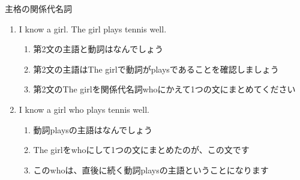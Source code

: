 \documentclass[aspectratio=169,xcolor={dvipsnames,table}]{beamer}
\begin{document}
\begin{frame}[plain]{主格の関係代名詞}

\dbend%

\bigskip

\begin{enumerate}
 \item<1-> I know a girl. The girl plays tennis well.
       \begin{enumerate}
	\item<2-> 第2文の主語と動詞はなんでしょう
	\item<3-> 第2文の主語はThe girlで動詞がplaysであることを確認しましょう
	\item<4-> 第2文のThe girlを関係代名詞whoにかえて1つの文にまとめてください
       \end{enumerate}
 \item<5-> I know a girl who plays tennis well.
       \begin{enumerate}
	\item<6-> 動詞playsの主語はなんでしょう
	\item<7-> The girlをwhoにして1つの文にまとめたのが、この文です
	\item<8-> このwhoは、直後に続く動詞playsの主語ということになります
       \end{enumerate}
\end{enumerate}

\end{frame}
\end{document}
